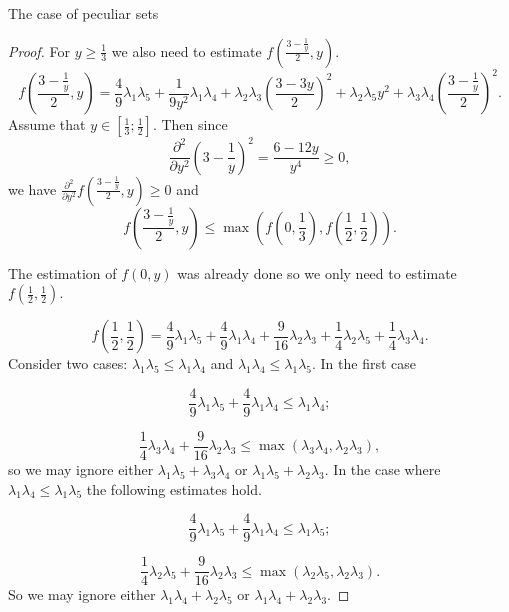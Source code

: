 \documentclass[12pt]{article}
\begin{document}
\begin{section}{The case of peculiar sets}
\begin{proof}
        For $y\geq \frac{1}{3}$ we also need to estimate $f\left(\frac{3-\frac{1}{y}}{2}, y\right)$. 
        $$
         f\left(\frac{3-\frac{1}{y}}{2}, y\right) =  \frac{4}{9}\lambda_{1}\lambda_{5} + \frac{1}{9y^2}\lambda_{1}\lambda_{4}+ \lambda_{2}\lambda_{3}\left(\frac{3-3y}{2}\right)^2 + \lambda_{2}\lambda_{5}y^2 + \lambda_{3}\lambda_{4}\left(\frac{3-\frac{1}{y}}{2}\right)^2 .  
        $$
        Assume that $y\in \left[\frac{1}{3}; \frac{1}{2}\right]$. Then since
        $$
            \frac{\partial^{2}}{\partial y^2}\left(3-\frac{1}{y}\right)^2 = \frac{6 - 12y }{y^4}\geq 0,
        $$
        we have $\frac{\partial^{2}}{\partial y^2}f\left(\frac{3-\frac{1}{y}}{2}, y\right)\geq 0$ and $$
            f\left(\frac{3-\frac{1}{y}}{2}, y\right)\leq \max \left(f\left(0,\frac{1}{3}\right), f\left(\frac{1}{2}, \frac{1}{2}\right)\right).
        $$

        The estimation of $f(0,y)$ was already  done so we only need to estimate $f\left(\frac{1}{2},\frac{1}{2}\right).$

        $$
            f\left(\frac{1}{2},\frac{1}{2}\right) = \frac{4}{9}\lambda_{1}\lambda_{5} + \frac{4}{9}\lambda_{1}\lambda_{4}+ \frac{9}{16}\lambda_{2}\lambda_{3} + \frac{1}{4}\lambda_{2}\lambda_{5} + \frac{1}{4}\lambda_{3}\lambda_{4} . 
        $$
        Consider two cases: $\lambda_{1}\lambda_{5}\leq \lambda_{1}\lambda_{4}$ and $\lambda_{1}\lambda_{4}\leq \lambda_{1}\lambda_{5}$. In the first case 

        $$
             \frac{4}{9}\lambda_{1}\lambda_{5} + \frac{4}{9}\lambda_{1}\lambda_{4}\leq \lambda_{1}\lambda_{4};
        $$

        $$
            \frac{1}{4}\lambda_{3}\lambda_{4} + \frac{9}{16}\lambda_{2}\lambda_{3} \leq \max (\lambda_{3}\lambda_{4}, \lambda_{2}\lambda_{3} ),
        $$
        so we may ignore either $\lambda_{1}\lambda_{5} + \lambda_{3}\lambda_{4}$ or $\lambda_{1}\lambda_{5} + \lambda_{2}\lambda_{3}$. In the case where $\lambda_{1}\lambda_{4}\leq \lambda_{1}\lambda_{5}$ the following estimates hold.

        $$
             \frac{4}{9}\lambda_{1}\lambda_{5} + \frac{4}{9}\lambda_{1}\lambda_{4}\leq \lambda_{1}\lambda_{5};
        $$

        $$
            \frac{1}{4}\lambda_{2}\lambda_{5} + \frac{9}{16}\lambda_{2}\lambda_{3} \leq \max (\lambda_{2}\lambda_{5}, \lambda_{2}\lambda_{3} ).
        $$
        So we may ignore either $\lambda_{1}\lambda_{4} + \lambda_{2}\lambda_{5}$ or $\lambda_{1}\lambda_{4} + \lambda_{2}\lambda_{3}$. 


\end{proof}
\end{section}
\end{document}
